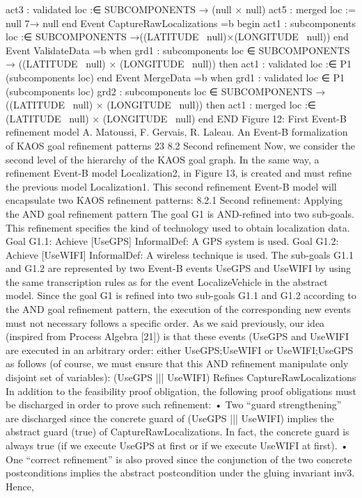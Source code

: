 act3 : validated loc :∈ SUBCOMPONENTS → ({null} × {null})
act5 : merged loc := null 7→ null
end
Event CaptureRawLocalizations =b
begin
act1 : subcomponents loc :∈ SUBCOMPONENTS →((LATITUDE \ {null})×(LONGITUDE \
{null}))
end
Event ValidateData =b
when
grd1 : subcomponents loc ∈ SUBCOMPONENTS → ((LATITUDE \ {null}) × (LONGITUDE \
{null}))
then
act1 : validated loc :∈ P1 (subcomponents loc)
end
Event MergeData =b
when
grd1 : validated loc ∈ P1 (subcomponents loc)
grd2 : subcomponents loc ∈ SUBCOMPONENTS → ((LATITUDE \ {null}) × (LONGITUDE \
{null}))
then
act1 : merged loc :∈ (LATITUDE \ {null}) × (LONGITUDE \ {null})
end
END
Figure 12: First Event-B refinement model
A. Matoussi, F. Gervais, R. Laleau. An Event-B formalization of KAOS goal refinement patterns 23
8.2 Second refinement
Now, we consider the second level of the hierarchy of the KAOS goal graph. In the same
way, a refinement Event-B model Localization2, in Figure 13, is created and must refine the
previous model Localization1. This second refinement Event-B model will encapsulate two
KAOS refinement patterns:
8.2.1 Second refinement: Applying the AND goal refinement pattern
The goal G1 is AND-refined into two sub-goals. This refinement specifies the kind of technology used to obtain localization data.
Goal G1.1: Achieve [UseGPS]
InformalDef: A GPS system is used.
Goal G1.2: Achieve [UseWIFI]
InformalDef: A wireless technique is used.
The sub-goals G1.1 and G1.2 are represented by two Event-B events UseGPS and UseWIFI
by using the same transcription rules as for the event LocalizeVehicle in the abstract model.
Since the goal G1 is refined into two sub-goals G1.1 and G1.2 according to the AND goal
refinement pattern, the execution of the corresponding new events must not necessary follows a specific order. As we said previously, our idea (inspired from Process Algebra [21])
is that these events (UseGPS and UseWIFI are executed in an arbitrary order: either
UseGPS;UseWIFI or UseWIFI;UseGPS as follows (of course, we must ensure that this
AND refinement manipulate only disjoint set of variables):
(UseGPS ||| UseWIFI) Refines CaptureRawLocalizations
In addition to the feasibility proof obligation, the following proof obligations must be
discharged in order to prove such refinement:
• Two “guard strengthening” are discharged since the concrete guard of (UseGPS |||
UseWIFI) implies the abstract guard (true) of CaptureRawLocalizations. In fact,
the concrete guard is always true (if we execute UseGPS at first or if we execute
UseWIFI at first).
• One “correct refinement” is also proved since the conjunction of the two concrete postconditions implies the abstract postcondition under the gluing invariant inv3. Hence,

